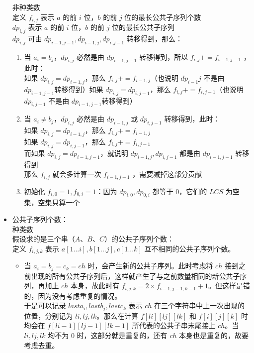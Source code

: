 \documentclass[E:/GsjzTle/main/main.tex]{subfiles}
\begin{document}
\begin{itemize}
		非种类数\\
		定义 \(f_{i,j}\) 表示 \(a\) 的前 \(i\) 位，\(b\) 的前 \(j\)
		位的最长公共子序列个数\\
		\(dp_{i,j}\) 表示 \(a\) 的前 \(i\) 位，\(b\) 的前 \(j\)
		位的最长公共子序列\\
		\(dp_{i,j}\) 可由 \(dp_{i-1,j-1},dp_{i-1,j},dp_{i,j-1}\)
		转移得到，那么：
		
		\begin{enumerate}
			\def\labelenumi{\arabic{enumi}.}
			\item
			当 \(a_i=b_j\)，\(dp_{i,j}\) 必然是由 \(dp_{i-1,j-1}\)
			转移得到，所以 \(f_{i,j} += f_{i-1,j-1}\) ，此时：\\
			如果 \(dp_{i,j} = dp_{i-1,j}\)，那么 \(f_{i,j}+=f_{i-1,j}\)（也说明
			\(dp_{i-1}{j}\) 不是由 \(dp_{i-1,j-1}\)转移得到）如果
			\(dp_{i,j}=dp_{i,j-1}\)，那么 \(f_{i,j} += f_{i,j-1}\)（也说明
			\(dp_{i,j-1}\) 不是由 \(dp_{i-1,j-1}\)转移得到）
			\item
			当 \(a_i \neq b_j\)，\(dp_{i,j}\) 必然是由 \(dp_{i-1,j}\) 或
			\(dp_{i,j-1}\) 转移得到，此时：\\
			如果 \(dp_{i,j} = dp_{i-1,j}\)，那么 \(f_{i,j}+=f_{i-1,j}\)\\
			如果 \(dp_{i,j} = dp_{i,j-1}\)，那么 \(f_{i,j}+=f_{i,j-1}\)\\
			而如果 \(dp_{i,j} = dp_{i-1,j-1}\)，就说明 \(dp_{i-1,j},dp_{i,j-1}\)
			都是由 \(dp_{i-1,j-1}\) 转移得到\\
			那么 \(f_{i,j}\) 就会多计算一次 \(f_{i-1,j-1}\) ，需要减掉这部分贡献
			\item
			初始化 \(f_{i,0} = 1,f_{0,i}=1\)：因为 \(dp_{i,0},dp_{0,i}\) 都等于
			\(0\)，它们的 \(LCS\) 为空集，空集只算一个
		\end{enumerate}
		\item
		公共子序列个数：\\
		种类数\\
		假设求的是三个串（\(A\)、\(B\)、\(C\)）的公共子序列个数：\\
		定义 \(f_{i,j,k}\) 表示 \(a[1...i],b[1...j],c[1...k]\)
		互不相同的公共子序列个数。
		
		\begin{itemize}
			\item
			当 \(a_i=b_j=c_k=ch\) 时，会产生新的公共子序列。此时考虑将 \(ch\)
			接到之前出现的所有公共子序列后，这样就产生了与之前数量相同的新公共子序列，再加上
			\(ch\) 本身，故此时有
			\(f_{i,j,k} = 2\times f_{i-1,j-1,k-1}+1\)。但这样是错的，因为没有考虑重复的情况。\\
			于是可以记录 \(lasta_{{i}},lastb_{{j}},lastc_{{k}}\) 表示 \(ch\)
			在三个字符串中上一次出现的位置，分别记为 \(li,lj,lk\)。那么在计算
			\(f[li][lj][lk]\) 和 \(f[i][j][k]\) 时均会在 \(f[li-1][lj-1][lk-1]\)
			所代表的公共子串末尾接上 \(ch\)。当 \(li,lj,lk\) 均不为 \(0\)
			时，这部分就是重复的，还有 \(ch\) 本身也是重复的，故要考虑去重。
			

\end{itemize}
\end{itemize}
\end{document}
